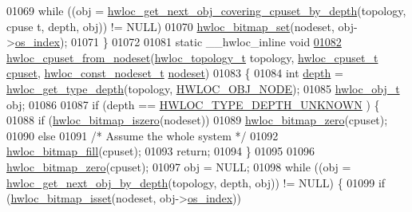 \begin{DoxyCode}
01069         \textcolor{keywordflow}{while} ((obj = \hyperlink{a00056_ga2f9a4ec15e9cfae8c21501257a51ce5b}{hwloc_get_next_obj_covering_cpuset_by_depth}(topology, cpuse
      t, depth, obj)) != NULL)
01070                 \hyperlink{a00065_ga497556af0cc34f109ae0277999c074d3}{hwloc_bitmap_set}(nodeset, obj->\hyperlink{a00016_a61a7a80a68eaccbaaa28269e678c81a9}{os_index});
01071 \}
01072 
01081 \textcolor{keyword}{static} \_\_hwloc\_inline \textcolor{keywordtype}{void}
\hypertarget{a00031_source_l01082}{}\hyperlink{a00062_gaa677fd588304b5615de4ea78104adfb5}{01082} \hyperlink{a00062_gaa677fd588304b5615de4ea78104adfb5}{hwloc_cpuset_from_nodeset}(\hyperlink{a00039_ga9d1e76ee15a7dee158b786c30b6a6e38}{hwloc_topology_t} topology, \hyperlink{a00040_ga4bbf39b68b6f568fb92739e7c0ea7801}{hwloc_cpuset_t} \hyperlink{a00016_a67925e0f2c47f50408fbdb9bddd0790f}{cpuset}, 
      \hyperlink{a00040_ga2f5276235841ad66a79bedad16a5a10c}{hwloc_const_nodeset_t} \hyperlink{a00016_a08f0d0e16c619a6e653526cbee4ffea3}{nodeset})
01083 \{
01084         \textcolor{keywordtype}{int} \hyperlink{a00016_a9d82690370275d42d652eccdea5d3ee5}{depth} = \hyperlink{a00046_gaea7c64dd59467f5201ba87712710b14d}{hwloc_get_type_depth}(topology, \hyperlink{a00041_ggacd37bb612667dc437d66bfb175a8dc55aaf0964881117bdedf1a5e9332cd120dd}{HWLOC_OBJ_NODE});
01085         \hyperlink{a00016}{hwloc_obj_t} obj;
01086 
01087         \textcolor{keywordflow}{if} (depth == \hyperlink{a00046_ggaf4e663cf42bbe20756b849c6293ef575a0565ab92ab72cb0cec91e23003294aad}{HWLOC_TYPE_DEPTH_UNKNOWN} ) \{
01088                 \textcolor{keywordflow}{if} (\hyperlink{a00065_gaa94fed35d2a598bc4a8657b6955b7bf5}{hwloc_bitmap_iszero}(nodeset))
01089                         \hyperlink{a00065_ga6c540b9fe63b8223b6aba46d56dd63b8}{hwloc_bitmap_zero}(cpuset);
01090                 \textcolor{keywordflow}{else}
01091                         \textcolor{comment}{/* Assume the whole system */}
01092                         \hyperlink{a00065_ga52456f7ef79d68e610cb65e3f7ffafad}{hwloc_bitmap_fill}(cpuset);
01093                 \textcolor{keywordflow}{return};
01094         \}
01095 
01096         \hyperlink{a00065_ga6c540b9fe63b8223b6aba46d56dd63b8}{hwloc_bitmap_zero}(cpuset);
01097         obj = NULL;
01098         \textcolor{keywordflow}{while} ((obj = \hyperlink{a00053_gab7c1dce3f42ece5bfa621e87cf332418}{hwloc_get_next_obj_by_depth}(topology, depth, obj)) != NULL)
       \{
01099                 \textcolor{keywordflow}{if} (\hyperlink{a00065_ga2583f44cbdb5fff2ea40efdcf3975d3f}{hwloc_bitmap_isset}(nodeset, obj->\hyperlink{a00016_a61a7a80a68eaccbaaa28269e678c81a9}{os_index}))

\end{DoxyCode}
